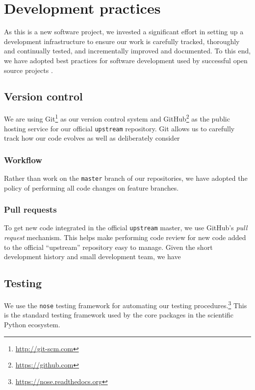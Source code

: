 \chapter{\label{ch:dev}Development practices}

As this is a new software project, we invested a significant effort in setting
up a development infrastructure to ensure our work is carefully tracked,
thoroughly and continually tested, and incrementally improved and documented.
To this end, we have adopted best practices for software development used by
successful open source projects \cite{millman2014}.

\section{\label{sec:vc}Version control}

We are using Git\footnote{\url{http://git-scm.com}} as our version control
system and GitHub\footnote{\url{https://github.com}} as the public hosting
service for our official \texttt{upstream} repository.  Git allows us to
carefully track how our code evolves as well as deliberately consider 

\subsection{Workflow}

Rather than work on the \texttt{master} branch of our repositories,
we have adopted the policy of performing all code changes on
feature branches.

\subsection{Pull requests}

To get new code integrated in the official \texttt{upstream} master, we use
GitHub's \emph{pull request} mechanism.  This helps make performing code review
for new code added to the official ``upstream'' repository easy to manage.
Given the short development history and small development team, we have 

\section{\label{sec:test}Testing}

We use the \texttt{nose} testing framework for automating our testing
procedures.\footnote{\url{https://nose.readthedocs.org}}  This is the standard
testing framework used by the core packages in the scientific Python ecosystem.


